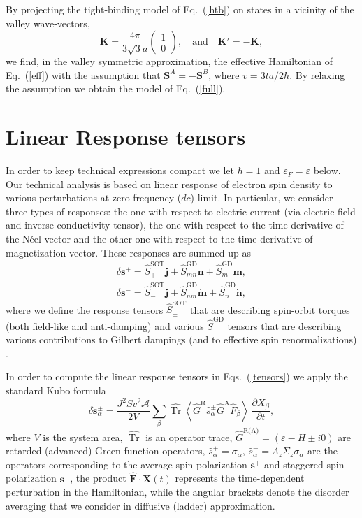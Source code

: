 \documentclass[%
  twocolumn,
  aps,
  prb,
  amsmath,
  amssymb,
  superscriptaddress,
  nofootinbib,
  floatfix
]{revtex4-1}
\newcommand{\s}{\sum\limits}
\newcommand{\pa}{\partial}
\newcommand{\be}{\begin{equation}}
\newcommand{\e}{\end{equation}}
\newcommand{\beml}{\begin{subequations}}
\newcommand{\eml}{\end{subequations}}
\newcommand{\bpm}{\begin{pmatrix}}
\newcommand{\epm}{\end{pmatrix}}
\newcommand{\lt}{\left}
\newcommand{\rt}{\right}
\newcommand{\la}{\langle}
\newcommand{\ra}{\rangle}
\newcommand{\ep}{\varepsilon}
\newcommand{\bb}{\boldsymbol}
\newcommand{\0}{^{\phantom{\dagger}}}
\DeclareMathOperator{\tr}{Tr}
\begin{document}
By projecting the tight-binding model of Eq.~(\ref{htb}) on states in a vicinity of the valley wave-vectors,
\be
\bb{K}= \frac{4\pi}{3\sqrt{3} a}\bpm 1\\ 0\epm,\quad\mbox{and}\quad \bb{K}'= -\bb{K},
\e
we find, in the valley symmetric approximation, the effective Hamiltonian of Eq.~(\ref{eff}) with the assumption that $\bb{S}^A=-\bb{S}^B$, where $v = 3ta/2\hbar$. By relaxing the assumption we obtain the model of Eq.~(\ref{full}).

\section{Linear Response tensors}\label{sec:appb}
\label{app:vertexcorrections}
In order to keep technical expressions compact we let $\hbar=1$ and $\ep_F=\ep$ below. Our technical analysis is based on linear response of electron spin density to various perturbations at zero frequency ($dc$) limit. In particular, we consider three types of responses: the one with respect to electric current (via electric field and inverse conductivity tensor), the one with respect to the time derivative of the N\'eel vector 
and the other one with respect to the time derivative of magnetization vector. These responses are summed up as
\beml
\label{tensors}
\begin{align}
\delta\bb{s}^+=\hat{S}^\textrm{SOT}_+\bb{j} +\hat{S}^\textrm{GD}_{mn} \dot{\bb{n}}+\hat{S}^\textrm{GD}_m\dot{\bb{m}},\\
\delta\bb{s}^-=\hat{S}^\textrm{SOT}_-\bb{j}+\hat{S}^\textrm{GD}_{nm}\dot{\bb{m}}+\hat{S}^\textrm{GD}_n \dot{\bb{n}},
\end{align}
\eml
where we define the response tensors $\hat{S}^\textrm{SOT}_\pm$ that are describing spin-orbit torques (both field-like and anti-damping) and various $\hat{S}^\textrm{GD}$ tensors that are describing various contributions to Gilbert dampings (and to effective spin renormalizations) \cite{AdoSTTGD2019}.

In order to compute the linear response tensors in Eqs.~(\ref{tensors}) we apply the standard Kubo formula
\be
\label{eq:kubo}
\delta\bb{s}^\pm_\alpha = 
\frac{J^2Sv^2\mathcal{A}}{2 V}
\s_\beta \widehat{\tr}  \lt\la \hat{G}^\text{R} \hat{s}^\pm_\alpha \hat{G}^\text{A}  
\hat{F}_\beta \rt\ra \,\frac{\pa X_\beta}{\pa t},
\e
where $V$ is the system area, $\widehat{\tr}$ is an operator trace, $\hat{G}^\text{R(A)}=(\ep-H\pm i 0)$ are retarded (advanced) Green function operators, $\hat{s}_\alpha^+ = \sigma_\alpha$, $\hat{s}_\alpha^-=\Lambda_z\Sigma_z\sigma_\alpha$ are the operators corresponding to the average spin-polarization $\bb{s}^+$ and staggered spin-polarization $\bb{s}^-$, the product $\hat{\bb{F}}\cdot \bb{X}(t)$ represents the time-dependent perturbation in the Hamiltonian, while the angular brackets denote the disorder averaging that we consider in diffusive (ladder) approximation.
\end{document}
